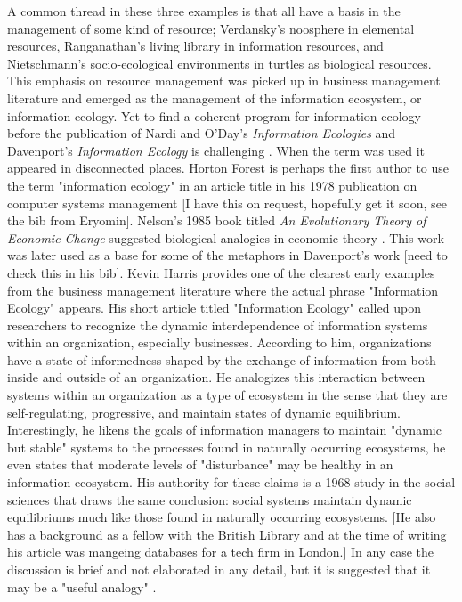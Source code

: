 A common thread in these three examples is that all have a basis in the management of some kind of resource; Verdansky's noosphere in elemental resources, Ranganathan's living library in information resources, and Nietschmann's socio-ecological environments in turtles as biological resources. This emphasis on resource management was picked up in business management literature and emerged as the management of the information ecosystem, or information ecology. Yet to find a coherent program for information ecology before the publication of Nardi and O'Day's \textit{Information Ecologies} and Davenport's \textit{Information Ecology} is challenging \citep{nardi_information_1999, davenport_information_1997}. When the term was used it appeared in disconnected places. Horton Forest is perhaps the first author to use the term "information ecology" in an article title in his 1978 publication on computer systems management \citep{forest_1978} [I have this on request, hopefully get it soon, see the bib from Eryomin]. Nelson's 1985 book titled \textit{An Evolutionary Theory of Economic Change} suggested biological analogies in economic theory \citep{nelson_evolutionary_1985}. This work was later used as a base for some of the metaphors in Davenport's work [need to check this in his bib]. Kevin Harris provides one of the clearest early examples from the business management literature where the actual phrase "Information Ecology" appears. His short article titled "Information Ecology" called upon researchers to recognize the dynamic interdependence of information systems within an organization, especially businesses. According to him, organizations have a state of informedness shaped by the exchange of information from both inside and outside of an organization. He analogizes this interaction between systems within an organization as a type of ecosystem in the sense that they are self-regulating, progressive, and maintain states of dynamic equilibrium. Interestingly, he likens the goals of information managers to maintain "dynamic but stable" systems to the processes found in naturally occurring ecosystems, he even states that moderate levels of "disturbance" may be healthy in an information ecosystem. His authority for these claims is a 1968 study in the social sciences that draws the same conclusion: social systems maintain dynamic equilibriums much like those found in naturally occurring ecosystems. [He also has a background as a fellow with the British Library and at the time of writing his article was mangeing databases for a tech firm in London.] In any case the discussion is brief and not elaborated in any detail, but it is suggested that it may be a "useful analogy" \citep{harris_information_1989}.

